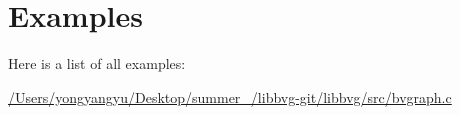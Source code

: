 \section{Examples}
Here is a list of all examples\+:\begin{DoxyCompactItemize}
\item 
\hyperlink{_2_users_2yongyangyu_2_desktop_2summer_2014_2libbvg-git_2libbvg_2src_2bvgraph_8c-example}{/\+Users/yongyangyu/\+Desktop/summer\+\_/libbvg-\/git/libbvg/src/bvgraph.\+c}
\end{DoxyCompactItemize}
